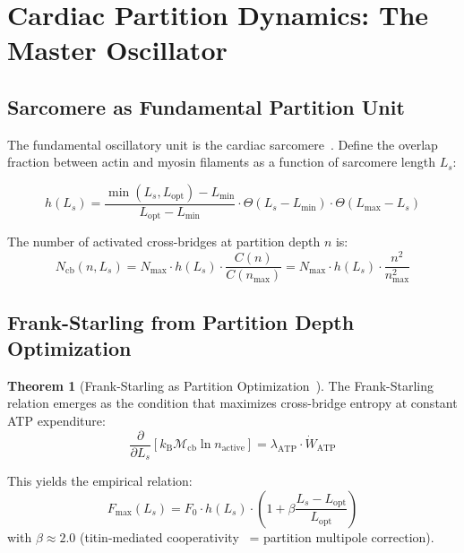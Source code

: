 \documentclass[10pt,twocolumn,a4paper]{article}
\theoremstyle{definition}
\newtheorem{theorem}{Theorem}
\newcommand{\kB}{k_{\text{B}}}
\begin{document}
\section{Cardiac Partition Dynamics: The Master Oscillator}
\label{sec:cardiac}

\subsection{Sarcomere as Fundamental Partition Unit}

The fundamental oscillatory unit is the cardiac sarcomere~\cite{gordon1966variation,huxley1954structural}. Define the
overlap fraction between actin and myosin filaments as a function of
sarcomere length $L_s$:

\begin{equation}
h(L_s) = \frac{\min(L_s, L_{\text{opt}}) - L_{\min}}{L_{\text{opt}} - L_{\min}}
\cdot \Theta(L_s - L_{\min}) \cdot \Theta(L_{\max} - L_s)
\end{equation}

The number of activated cross-bridges at partition depth $n$ is:
\begin{equation}
N_{\text{cb}}(n, L_s) = N_{\max} \cdot h(L_s) \cdot \frac{C(n)}{C(n_{\max})}
= N_{\max} \cdot h(L_s) \cdot \frac{n^2}{n_{\max}^2}
\end{equation}

\subsection{Frank-Starling from Partition Depth Optimization}

\begin{theorem}[Frank-Starling as Partition Optimization~\cite{frank1895dynamics,starling1918law}]
The Frank-Starling relation emerges as the condition that maximizes cross-bridge
entropy at constant ATP expenditure:
\begin{equation}
\boxed{\frac{\partial}{\partial L_s}\left[\kB \mathcal{M}_{\text{cb}} \ln n_{\text{active}}\right]
= \lambda_{\text{ATP}} \cdot \dot{W}_{\text{ATP}}}
\end{equation}
\end{theorem}

This yields the empirical relation:
\begin{equation}
F_{\max}(L_s) = F_0 \cdot h(L_s) \cdot \left(1 + \beta \frac{L_s - L_{\text{opt}}}{L_{\text{opt}}}\right)
\end{equation}
with $\beta \approx 2.0$ (titin-mediated cooperativity~\cite{granzier1995titin,linke2008sense} = partition multipole correction).
\end{document}
